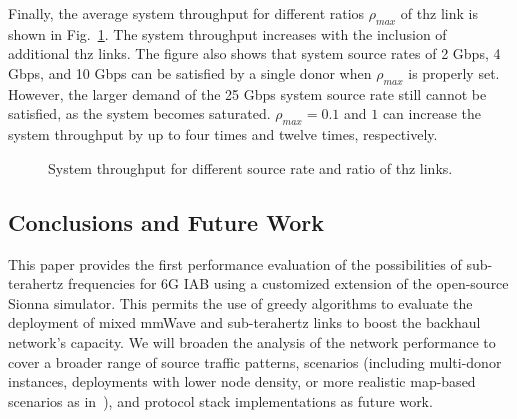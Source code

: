 Finally, the average system throughput for different ratios $\rho_{max}$ of \gls{thz} link is shown in Fig.~\ref{fig:THZtotal}.
The system throughput increases with the inclusion of additional \gls{thz} links. 
The figure also shows that system source rates of 2 Gbps, 4 Gbps, and 10 Gbps can be satisfied by a single donor when $\rho_{max}$ is properly set.
%
However, the larger demand of the 25 Gbps system source rate still cannot be satisfied, as the system becomes saturated.
$\rho_{max} = 0.1$ and $1$ can increase the system throughput by up to four times and twelve times, respectively.

\begin{figure}
    \centering
    \setlength{}
    \setlength{}
    
    \caption{System throughput for different source rate and ratio of \gls{thz} links.}
    \label{fig:THZtotal}
\end{figure}


\subsection{Conclusions and Future Work}
\label{sec:concl}
This paper provides the first performance evaluation of the possibilities of sub-terahertz frequencies for 6G IAB using a customized extension of the open-source Sionna simulator. This permits the use of greedy algorithms to evaluate the deployment of mixed mmWave and sub-terahertz links to boost the backhaul network's capacity.
We will broaden the analysis of the network performance to cover a broader range of source traffic patterns, scenarios (including multi-donor instances, deployments with lower node density, or more realistic map-based scenarios as in~\cite{gemmi2023on,gemmi2022on}), and protocol stack implementations as future work.



% 
% 

% 